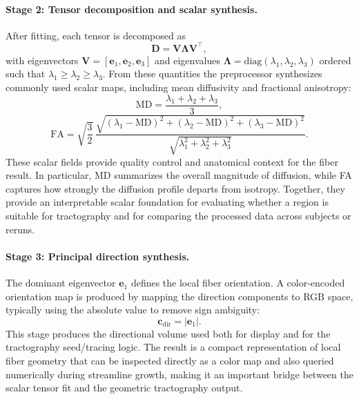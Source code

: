 \paragraph{Stage 2: Tensor decomposition and scalar synthesis.}
After fitting, each tensor is decomposed as
\begin{equation}
\mathbf{D} = \mathbf{V} \boldsymbol{\Lambda} \mathbf{V}^\top,
\end{equation}
with eigenvectors $\mathbf{V} = [\mathbf{e}_1, \mathbf{e}_2, \mathbf{e}_3]$ and eigenvalues $\boldsymbol{\Lambda} = \mathrm{diag}(\lambda_1, \lambda_2, \lambda_3)$ ordered such that $\lambda_1 \ge \lambda_2 \ge \lambda_3$. From these quantities the preprocessor synthesizes commonly used scalar maps, including mean diffusivity and fractional anisotropy:
\begin{equation}
\mathrm{MD} = \frac{\lambda_1 + \lambda_2 + \lambda_3}{3},
\end{equation}
\begin{equation}
\mathrm{FA} = \sqrt{\frac{3}{2}}\,
\frac{\sqrt{(\lambda_1-\mathrm{MD})^2 + (\lambda_2-\mathrm{MD})^2 + (\lambda_3-\mathrm{MD})^2}}
	{\sqrt{\lambda_1^2 + \lambda_2^2 + \lambda_3^2}}.
\end{equation}
These scalar fields provide quality control and anatomical context for the fiber result. In particular, MD summarizes the overall magnitude of diffusion, while FA captures how strongly the diffusion profile departs from isotropy. Together, they provide an interpretable scalar foundation for evaluating whether a region is suitable for tractography and for comparing the processed data across subjects or reruns.

\paragraph{Stage 3: Principal direction synthesis.}
The dominant eigenvector $\mathbf{e}_1$ defines the local fiber orientation. A color-encoded orientation map is produced by mapping the direction components to RGB space, typically using the absolute value to remove sign ambiguity:
\begin{equation}
\mathbf{c}_{\mathrm{dir}} = \left|\mathbf{e}_1\right|.
\end{equation}
This stage produces the directional volume used both for display and for the tractography seed/tracing logic. The result is a compact representation of local fiber geometry that can be inspected directly as a color map and also queried numerically during streamline growth, making it an important bridge between the scalar tensor fit and the geometric tractography output.

